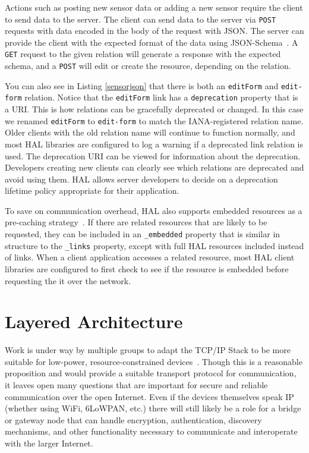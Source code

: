 \documentclass{acm_proc_article-sp}
\begin{document}
Actions such as posting new sensor data or adding a new sensor require the
client to send data to the server. The client can send data to the server via
\texttt{POST} requests with data encoded in the body of the request with JSON.
The server can provide the client with the expected format of the data using
JSON-Schema~\cite{json-schema-draft}. A \texttt{GET} request to the given
relation will generate a response with the expected schema, and a \texttt{POST}
will edit or create the resource, depending on the relation.

You can also see in Listing \ref{sensorjson} that there is both an
\mbox{\texttt{editForm}} and \texttt{edit-form} relation. Notice that the
\texttt{editForm} link has a \texttt{deprecation} property that is a URI.  This
is how relations can be gracefully deprecated or changed. In this case we
renamed \texttt{editForm} to \texttt{edit-form} to match the IANA-registered
relation name. Older clients with the old relation name will continue to
function normally, and most HAL libraries are configured to log a warning if a
deprecated link relation is used. The deprecation URI can be viewed for
information about the deprecation. Developers creating new clients can clearly
see which relations are deprecated and avoid using them. HAL allows server
developers to decide on a deprecation lifetime policy appropriate for their
application.

To save on communication overhead, HAL also supports embedded resources as a
pre-caching strategy~\cite{json-hal-draft}. If there are related resources that
are likely to be requested, they can be included in an \texttt{\_embedded}
property that is similar in structure to the \texttt{\_links} property, except
with full HAL resources included instead of links. When a client application
accesses a related resource, most HAL client libraries are configured to first
check to see if the resource is embedded before requesting the it over the
network.

\section{Layered Architecture}

Work is under way by multiple groups to adapt the TCP/IP Stack to be more
suitable for low-power, resource-constrained devices~\cite{iotsurvey}. Though
this is a reasonable proposition and would provide a suitable transport
protocol for communication, it leaves open many questions that are important
for secure and reliable communication over the open Internet. Even if the
devices themselves speak IP (whether using WiFi, 6LoWPAN, etc.) there will
still likely be a role for a bridge or gateway node that can handle encryption,
authentication, discovery mechanisms, and other functionality necessary to
communicate and interoperate with the larger Internet.
\end{document}
